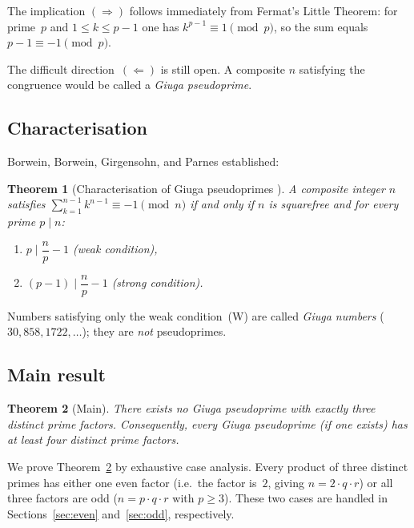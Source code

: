 \documentclass[12pt,a4paper]{amsart}
\newtheorem{theorem}{Theorem}[section]
\theoremstyle{definition}
\begin{document}
The implication $(\Rightarrow)$ follows immediately from Fermat's Little Theorem:
for prime~$p$ and $1 \le k \le p-1$ one has $k^{p-1} \equiv 1 \pmod{p}$,
so the sum equals $p - 1 \equiv -1 \pmod{p}$.

The difficult direction~$(\Leftarrow)$ is still open. A composite $n$
satisfying the congruence would be called a \emph{Giuga pseudoprime}.

\subsection{Characterisation}

Borwein, Borwein, Girgensohn, and Parnes \cite{Borwein1996} established:

\begin{theorem}[Characterisation of Giuga pseudoprimes {\cite{Borwein1996}}]
\label{thm:char}
A composite integer $n$ satisfies $\sum_{k=1}^{n-1} k^{n-1} \equiv -1 \pmod{n}$
if and only if $n$ is squarefree and for every prime $p \mid n$:
\begin{enumerate}
  \item[\textup{(W)}] $p \mid \dfrac{n}{p} - 1$  \quad\emph{(weak condition)},
  \item[\textup{(S)}] $(p-1) \mid \dfrac{n}{p} - 1$ \quad\emph{(strong condition)}.
\end{enumerate}
\end{theorem}

Numbers satisfying only the weak condition~(W) are called \emph{Giuga numbers}
($30, 858, 1722, \ldots$); they are \emph{not} pseudoprimes.

\subsection{Main result}

\begin{theorem}[Main]
\label{thm:main}
There exists no Giuga pseudoprime with exactly three distinct prime factors.
Consequently, every Giuga pseudoprime (if one exists) has at least four
distinct prime factors.
\end{theorem}

We prove Theorem~\ref{thm:main} by exhaustive case analysis.
Every product of three distinct primes has either one even factor (i.e.\ the
factor is~$2$, giving $n = 2 \cdot q \cdot r$) or all three factors are odd
($n = p \cdot q \cdot r$ with $p \ge 3$).  These two cases are handled in
Sections~\ref{sec:even} and~\ref{sec:odd}, respectively.
\end{document}

